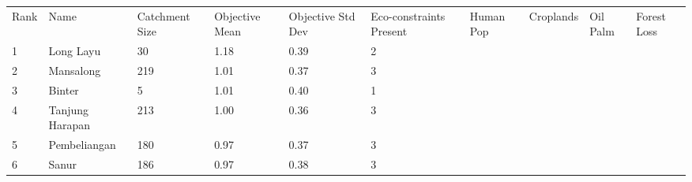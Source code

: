 \begin{table}[ht]
\centering
\begingroup\fontsize{8pt}{9pt}\selectfont
\begin{tabular}{C{0.03\textwidth}C{0.12\textwidth}C{0.09\textwidth}C{0.08\textwidth}C{0.08\textwidth}C{0.08\textwidth}C{0.07\textwidth}C{0.07\textwidth}C{0.07\textwidth}C{0.07\textwidth}}
 Rank & Name & Catchment Size & Objective Mean & Objective Std Dev & Eco-constraints  Present & Human Pop & Croplands & Oil Palm & Forest Loss \\ 
 {1} & Long Layu &  30 & \textcolor[HTML]{FFFFFF}{1.18} & \textcolor[HTML]{000000}{0.39} & \textcolor[HTML]{000000}{2} &  &  &  &  \\ 
  {2} & Mansalong & 219 & \textcolor[HTML]{FFFFFF}{1.01} & \textcolor[HTML]{000000}{0.37} & \textcolor[HTML]{000000}{3} &  &  &  &  \\ 
  {3} & Binter &   5 & \textcolor[HTML]{FFFFFF}{1.01} & \textcolor[HTML]{000000}{0.40} & \textcolor[HTML]{000000}{1} &  &  &  &  \\ 
  {4} & Tanjung Harapan & 213 & \textcolor[HTML]{FFFFFF}{1.00} & \textcolor[HTML]{000000}{0.36} & \textcolor[HTML]{000000}{3} &  &  &  &  \\ 
  {5} & Pembeliangan & 180 & \textcolor[HTML]{FFFFFF}{0.97} & \textcolor[HTML]{000000}{0.37} & \textcolor[HTML]{000000}{3} &  &  &  &  \\ 
  {6} & Sanur & 186 & \textcolor[HTML]{FFFFFF}{0.97} & \textcolor[HTML]{000000}{0.38} & \textcolor[HTML]{000000}{3} &  &  &  &  \\ 

\end{tabular}
\end{table}

